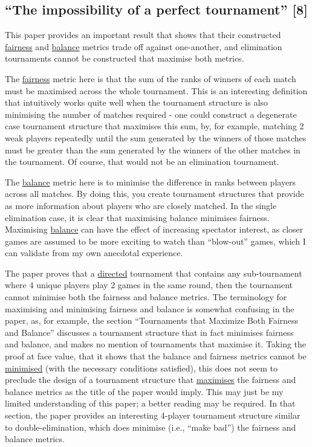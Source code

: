 \documentclass[a4,11pt,twoside,final]{article}
\makeatletter
\newcommand{\cslcitation}[2]
 {\protect\hyper@linkstart{cite}{citeproc_bib_item_#1}#2\hyper@linkend}
\makeatother
\begin{document}
\subsection{``The impossibility of a perfect tournament'' \cslcitation{8}{[8]}}
\label{sec:orgef3dfd7}

This paper provides an important result that shows that their constructed
\uline{fairness} and \uline{balance} metrics trade off against one-another, and elimination
tournaments cannot be constructed that maximise both metrics.

The \uline{fairness} metric here is that the sum of the ranks of winners of each match
must be maximised across the whole tournament. This is an interesting definition
that intuitively works quite well when the tournament structure is also
minimising the number of matches required - one could construct a degenerate
case tournament structure that maximises this sum, by, for example, matching 2
weak players repeatedly until the sum generated by the winners of those matches
must be greater than the sum generated by the winners of the other matches in
the tournament. Of course, that would not be an elimination tournament.

The \uline{balance} metric here is to minimise the difference in ranks between players
across all matches. By doing this, you create tournament structures that provide
as more information about players who are closely matched. In the single
elimination case, it is clear that maximising balance minimises fairness.
Maximising \uline{balance} can have the effect of increasing spectator interest, as
closer games are assumed to be more exciting to watch than ``blow-out'' games,
which I can validate from my own anecdotal experience.

The paper proves that a \uline{directed} tournament that contains any sub-tournament
where 4 unique players play 2 games in the same round, then the tournament
cannot minimise both the fairness and balance metrics. The terminology for
maximising and minimising fairness and balance is somewhat confusing in the
paper, as, for example, the section ``Tournaments that Maximize Both Fairness and
Balance'' discusses a tournament structure that in fact minimises fairness and
balance, and makes no mention of tournaments that maximise it. Taking the proof
at face value, that it shows that the balance and fairness metrics cannot be
\uline{minimised} (with the necessary conditions satisfied), this does not seem to
preclude the design of a tournament structure that \uline{maximises} the fairness and
balance metrics as the title of the paper would imply. This may just be my
limited understanding of this paper; a better reading may be required. In that
section, the paper provides an interesting 4-player tournament structure similar
to double-elimination, which does minimise (i.e., ``make bad'') the fairness and
balance metrics.
\end{document}
